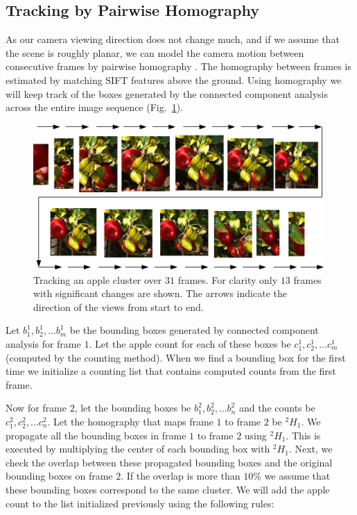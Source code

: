 \subsection{Tracking by Pairwise Homography}\label{sec:merge_homography}
As our camera viewing direction does not change much, and if we assume that the scene is roughly planar, we can model the camera motion between consecutive frames by pairwise homography \cite{eshel2008homography}. The homography between frames is estimated by matching SIFT \cite{sift} features above the ground. Using homography we will keep track of the boxes generated by the connected component analysis across the entire image sequence (Fig.~\ref{fig:trackcluster}).

\begin{figure}[!hbpt]
        \centering
            \includegraphics[width =0.99\textwidth]{figures/map_yield/clusterTrack_.pdf}           
   \caption[Tracking fruit over sequence of frames]{Tracking an apple cluster over $31$ frames. For clarity only $13$ frames with significant changes are shown. The arrows indicate the direction of the views from start to end.}
   \label{fig:trackcluster}
\end{figure}

Let $b^1_1, b^1_2, \ldots b^1_m$ be the bounding boxes generated by connected component analysis for frame $1$. Let the apple count for each of these boxes be $c^1_1, c^1_2, \ldots c^1_m$ (computed by the counting method). When we find a bounding box for the first time we initialize a counting list that contains computed counts from the first frame.

Now for frame $2$, let the bounding boxes be $b^{2}_1, b^{2}_2, \ldots b^{2}_n$ and the counts be $c^{2}_1, c^{2}_2, \ldots c^{2}_n$. Let the homography that maps frame $1$ to frame $2$ be $^2 H_{1}$. We propagate all the bounding boxes in frame $1$ to frame $2$ using $^2 H_{1}$. This is executed by multiplying the center of each bounding box with $^2 H_{1}$. Next, we check the overlap between these propagated bounding boxes and the original bounding boxes on frame $2$. If the overlap is more than $10\%$ we assume that these bounding boxes correspond to the same cluster. We will add the apple count to the list initialized previously using the following rules:

